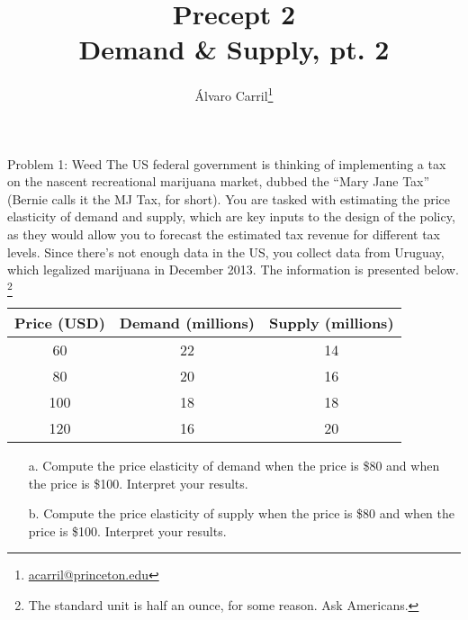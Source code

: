 \documentclass[10pt]{beamer}
\title{Precept 2 \\ Demand \& Supply, pt. 2}
\author{Álvaro Carril\thanks{\url{acarril@princeton.edu}}}
\institute{511c - Microeconomics \\ Princeton University}
\begin{document}
\begin{frame}
  \maketitle
\end{frame}

\begin{frame}[t]{Problem 1: Weed}
  The US federal government is thinking of implementing a tax on the nascent recreational marijuana market, dubbed the ``Mary Jane Tax'' (Bernie calls it the MJ Tax, for short).
  You are tasked with estimating the price elasticity of demand and supply, which are key inputs to the design of the policy, as they would allow you to forecast the estimated tax revenue for different tax levels.
  Since there's not enough data in the US, you collect data from Uruguay, which legalized marijuana in December 2013. The information is presented below.%
  \footnote{The standard unit is half an ounce, for some reason. Ask Americans.}

  \begin{table}
    \begin{tabular}{ccc}
      \toprule
      Price (USD) & Demand (millions) & Supply (millions) \\
      \midrule
      60 & 22 & 14 \\
      80 & 20 & 16 \\
      100 & 18 & 18 \\
      120 & 16 & 20 \\
      \bottomrule
    \end{tabular}
  \end{table}
\end{frame}

\begin{frame}[t]
  \begin{itemize}
    \item[a.] Compute the price elasticity of demand when the price is \$80 and when the price is \$100. Interpret your results.
  \end{itemize}
\end{frame}

\begin{frame}[t]
  \begin{itemize}
    \item[b.] Compute the price elasticity of supply when the price is \$80 and when the price is \$100.
    Interpret your results. 
  \end{itemize}
\end{frame}
\end{document}
